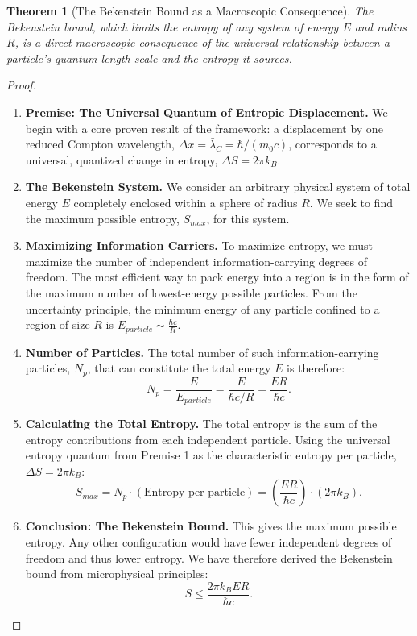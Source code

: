 \documentclass[11pt, letterpaper]{report}
\theoremstyle{plain} %
\newtheorem{theorem}{Theorem}[chapter]
\theoremstyle{definition} %
\theoremstyle{remark} %
\begin{document}
\begin{theorem}[The Bekenstein Bound as a Macroscopic Consequence]
\label{thm:verify_bekenstein_bound}
The Bekenstein bound, which limits the entropy of any system of energy $E$ and radius $R$, is a direct macroscopic consequence of the universal relationship between a particle's quantum length scale and the entropy it sources.
\end{theorem}
\begin{proof}
\begin{enumerate}
    \item \textbf{Premise: The Universal Quantum of Entropic Displacement.} We begin with a core proven result of the framework: a displacement by one reduced Compton wavelength, $\Delta x = \bar{\lambda}_C = \hbar/(m_0c)$, corresponds to a universal, quantized change in entropy, $\Delta S = 2\pi k_B$.

    \item \textbf{The Bekenstein System.} We consider an arbitrary physical system of total energy $E$ completely enclosed within a sphere of radius $R$. We seek to find the maximum possible entropy, $S_{max}$, for this system.

    \item \textbf{Maximizing Information Carriers.} To maximize entropy, we must maximize the number of independent information-carrying degrees of freedom. The most efficient way to pack energy into a region is in the form of the maximum number of lowest-energy possible particles. From the uncertainty principle, the minimum energy of any particle confined to a region of size $R$ is $E_{particle} \sim \frac{\hbar c}{R}$.

    \item \textbf{Number of Particles.} The total number of such information-carrying particles, $N_p$, that can constitute the total energy $E$ is therefore:
    \begin{equation}
        N_p = \frac{E}{E_{particle}} = \frac{E}{\hbar c / R} = \frac{ER}{\hbar c}.
    \end{equation}

    \item \textbf{Calculating the Total Entropy.} The total entropy is the sum of the entropy contributions from each independent particle. Using the universal entropy quantum from Premise 1 as the characteristic entropy per particle, $\Delta S = 2\pi k_B$:
    \begin{equation}
        S_{max} = N_p \cdot (\text{Entropy per particle}) = \left( \frac{ER}{\hbar c} \right) \cdot (2\pi k_B).
    \end{equation}

    \item \textbf{Conclusion: The Bekenstein Bound.} This gives the maximum possible entropy. Any other configuration would have fewer independent degrees of freedom and thus lower entropy. We have therefore derived the Bekenstein bound from microphysical principles:
    \begin{equation}
        S \le \frac{2\pi k_B E R}{\hbar c}.
    \end{equation}
\end{enumerate}
\end{proof}
\end{document}

